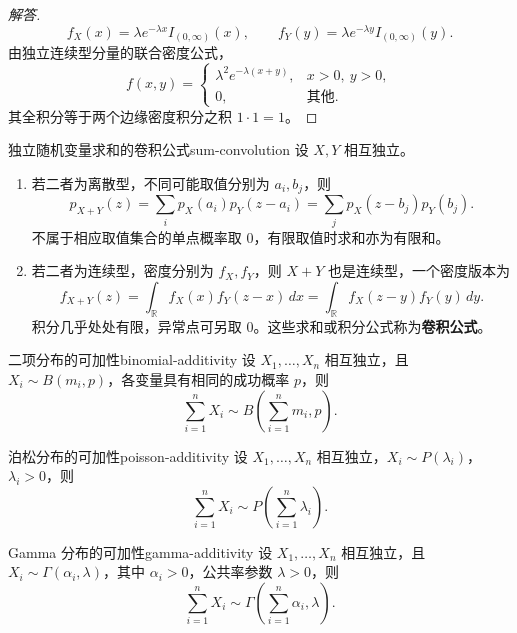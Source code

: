 \begin{proof}[解答]
\[
f_X(x)=\lambda e^{-\lambda x}I_{(0,\infty)}(x),\qquad
f_Y(y)=\lambda e^{-\lambda y}I_{(0,\infty)}(y).
\]
由独立连续型分量的联合密度公式，
\[
f(x,y)=
\begin{cases}
\lambda^2e^{-\lambda(x+y)},&x>0,\ y>0,\\
0,&\text{其他}.
\end{cases}
\]
其全积分等于两个边缘密度积分之积 $1\cdot1=1$。
\end{proof}

\begin{mytheorem}{独立随机变量求和的卷积公式}{sum-convolution}
设 $X,Y$ 相互独立。
\begin{enumerate}
\item 若二者为离散型，不同可能取值分别为 $a_i,b_j$，则
\[
p_{X+Y}(z)=\sum_i p_X(a_i)p_Y(z-a_i)
=\sum_jp_X(z-b_j)p_Y(b_j).
\]
不属于相应取值集合的单点概率取 $0$，有限取值时求和亦为有限和。
\item 若二者为连续型，密度分别为 $f_X,f_Y$，则 $X+Y$ 也是连续型，一个密度版本为
\[
f_{X+Y}(z)=\int_{\mathbb R}f_X(x)f_Y(z-x)\,dx
=\int_{\mathbb R}f_X(z-y)f_Y(y)\,dy.
\]
积分几乎处处有限，异常点可另取 $0$。这些求和或积分公式称为\textbf{卷积公式}。
\end{enumerate}
\end{mytheorem}

\begin{mytheorem}{二项分布的可加性}{binomial-additivity}
设 $X_1,\ldots,X_n$ 相互独立，且 $X_i\sim B(m_i,p)$，各变量具有相同的成功概率 $p$，则
\[
\sum_{i=1}^nX_i\sim B\left(\sum_{i=1}^nm_i,p\right).
\]
\end{mytheorem}

\begin{mytheorem}{泊松分布的可加性}{poisson-additivity}
设 $X_1,\ldots,X_n$ 相互独立，$X_i\sim P(\lambda_i)$，$\lambda_i>0$，则
\[
\sum_{i=1}^nX_i\sim P\left(\sum_{i=1}^n\lambda_i\right).
\]
\end{mytheorem}

\begin{mytheorem}{Gamma 分布的可加性}{gamma-additivity}
设 $X_1,\ldots,X_n$ 相互独立，且 $X_i\sim\Gamma(\alpha_i,\lambda)$，其中 $\alpha_i>0$，公共率参数 $\lambda>0$，则
\[
\sum_{i=1}^nX_i\sim\Gamma\left(\sum_{i=1}^n\alpha_i,\lambda\right).
\]
\end{mytheorem}

